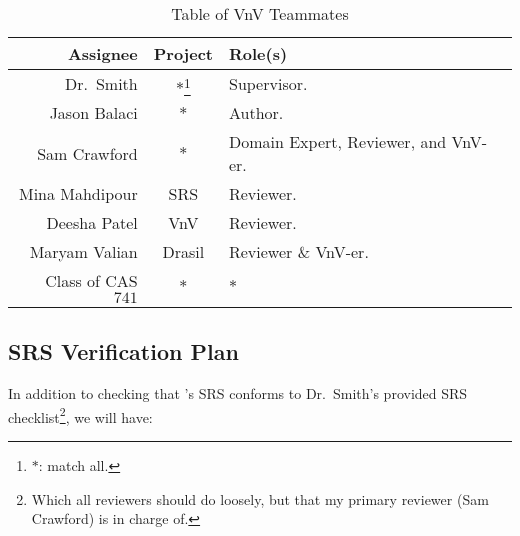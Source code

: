 \documentclass[12pt, titlepage]{article}
\begin{document}
\begin{longtable}{|r|c|l|}
    \caption{Table of VnV Teammates}
    \label{table:vnv_teammates}

    \\ \hline
    \rowcolor{Maroon}
    \textbf{Assignee}    & \textbf{Project}                  & \textbf{Role(s)}                                              \\ \hline
    \rowcolor{White}
    Dr.\ Smith           & \(*\)\footnote{\(*\): match all.} & Supervisor.                                                   \\ \hline
    Jason Balaci         & \(*\)                             & Author.                                                       \\ \hline
    Sam Crawford         & \(*\)                             & Domain Expert, Reviewer, and VnV-er.                          \\ \hline
    Mina Mahdipour       & SRS                               & Reviewer.                                                     \\ \hline
    Deesha Patel         & VnV                               & Reviewer.                                                     \\ \hline
    Maryam Valian        & Drasil                            & Reviewer \& VnV-er.                                           \\ \hline
    Class of CAS \(741\) & \(*\)                             & \(*\)                                                         \\ \hline
\end{longtable}

\subsection{SRS Verification Plan}
\label{srs-verification-plan}

In addition to checking that \progname{}'s SRS conforms to Dr.\ Smith's provided
SRS checklist\footnote{Which all reviewers should do loosely, but that my
primary reviewer (Sam Crawford) is in charge of.}, we will have:
\end{document}

